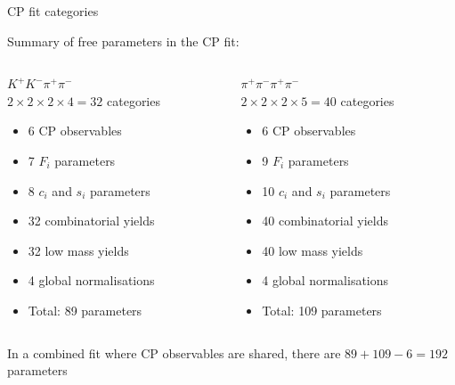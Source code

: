 \documentclass{beamer}
\begin{document}
\begin{frame}{CP fit categories}
  \begin{center}
    {\large Summary of free parameters in the CP fit:}
  \end{center}
  \vspace{-0.5cm}
  \begin{columns}
    \begin{column}{0.5\textwidth}
      \begin{center}
        $K^+K^-\pi^+\pi^-$ \\
        $2\times2\times2\times4 = 32$ categories
      \end{center}
      \begin{itemize}
        \setlength\itemsep{0.0em}
        \item{6 CP observables}
        \item{7 $F_i$ parameters}
        \item{8 $c_i$ and $s_i$ parameters}
        \item{32 combinatorial yields}
        \item{32 low mass yields}
        \item{4 global normalisations}
        \item{Total: 89 parameters}
      \end{itemize}
    \end{column}
    \begin{column}{0.5\textwidth}
      \begin{center}
        $\pi^+\pi^-\pi^+\pi^-$ \\
        $2\times2\times2\times5 = 40$ categories
      \end{center}
      \begin{itemize}
        \setlength\itemsep{0.0em}
        \item{6 CP observables}
        \item{9 $F_i$ parameters}
        \item{10 $c_i$ and $s_i$ parameters}
        \item{40 combinatorial yields}
        \item{40 low mass yields}
        \item{4 global normalisations}
        \item{Total: 109 parameters}
      \end{itemize}
    \end{column}
  \end{columns}
  \vspace{0.3cm}
  \begin{center}
    In a combined fit where CP observables are shared, there are $89 + 109 - 6 = 192$ parameters
  \end{center}
\end{frame}
\end{document}
